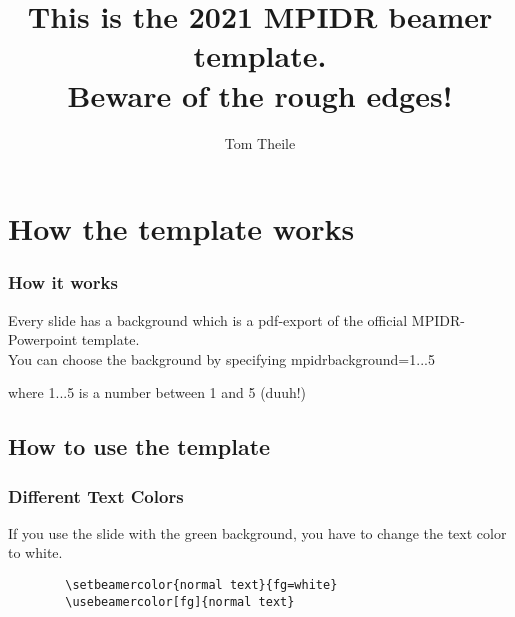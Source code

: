 \documentclass[aspectratio=169]{beamer}
\begin{document}
\title[beamer manual]										%
{This is the 2021 MPIDR beamer template. \\ Beware of the rough edges! }

\author[Theile]{Tom Theile}



\begin{frame}[mpidrbackground=1]
  \titlepage
\end{frame}



\section{How the template works}

\begin{frame}[mpidrbackground=2]
  \tableofcontents
\end{frame}


\begin{frame}[mpidrbackground=2]
    \frametitle{How it works}
  Every slide has a background which is a pdf-export of the official MPIDR-Powerpoint template.\\
  
  You can choose the background by specifying  mpidrbackground={1...5}
  
  where {1...5} is a number between 1 and 5 (duuh!)
  
\end{frame} 


\subsection{How to use the template}


\begin{frame}[mpidrbackground=1, fragile,label=notleM2bis] %
    \frametitle{Different Text Colors}
    
    If you use the slide with the green background, you have to change the text color to white.
    \begin{verbatim}
        \setbeamercolor{normal text}{fg=white}
        \usebeamercolor[fg]{normal text}
    \end{verbatim}
    
\end{frame}
\end{document}
